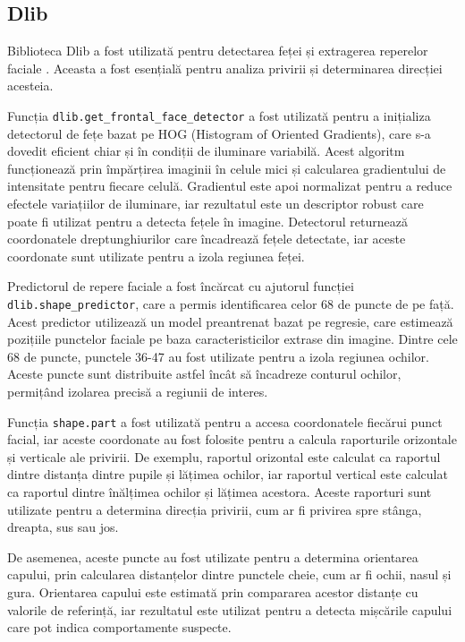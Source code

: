 \documentclass[12pt,a4paper]{article}
\begin{document}
\subsection{Dlib}
Biblioteca Dlib a fost utilizată pentru detectarea feței și extragerea reperelor faciale \cite{dlib}. Aceasta a fost esențială pentru analiza privirii și determinarea direcției acesteia. 

Funcția \texttt{dlib.get\_frontal\_face\_detector} a fost utilizată pentru a inițializa detectorul de fețe bazat pe HOG (Histogram of Oriented Gradients), care s-a dovedit eficient chiar și în condiții de iluminare variabilă. Acest algoritm funcționează prin împărțirea imaginii în celule mici și calcularea gradientului de intensitate pentru fiecare celulă. Gradientul este apoi normalizat pentru a reduce efectele variațiilor de iluminare, iar rezultatul este un descriptor robust care poate fi utilizat pentru a detecta fețele în imagine. Detectorul returnează coordonatele dreptunghiurilor care încadrează fețele detectate, iar aceste coordonate sunt utilizate pentru a izola regiunea feței.

Predictorul de repere faciale a fost încărcat cu ajutorul funcției \texttt{dlib.shape\_predictor}, care a permis identificarea celor 68 de puncte de pe față. Acest predictor utilizează un model preantrenat bazat pe regresie, care estimează pozițiile punctelor faciale pe baza caracteristicilor extrase din imagine. Dintre cele 68 de puncte, punctele 36-47 au fost utilizate pentru a izola regiunea ochilor. Aceste puncte sunt distribuite astfel încât să încadreze conturul ochilor, permițând izolarea precisă a regiunii de interes.

Funcția \texttt{shape.part} a fost utilizată pentru a accesa coordonatele fiecărui punct facial, iar aceste coordonate au fost folosite pentru a calcula raporturile orizontale și verticale ale privirii. De exemplu, raportul orizontal este calculat ca raportul dintre distanța dintre pupile și lățimea ochilor, iar raportul vertical este calculat ca raportul dintre înălțimea ochilor și lățimea acestora. Aceste raporturi sunt utilizate pentru a determina direcția privirii, cum ar fi privirea spre stânga, dreapta, sus sau jos.

De asemenea, aceste puncte au fost utilizate pentru a determina orientarea capului, prin calcularea distanțelor dintre punctele cheie, cum ar fi ochii, nasul și gura. Orientarea capului este estimată prin compararea acestor distanțe cu valorile de referință, iar rezultatul este utilizat pentru a detecta mișcările capului care pot indica comportamente suspecte.
\end{document}
